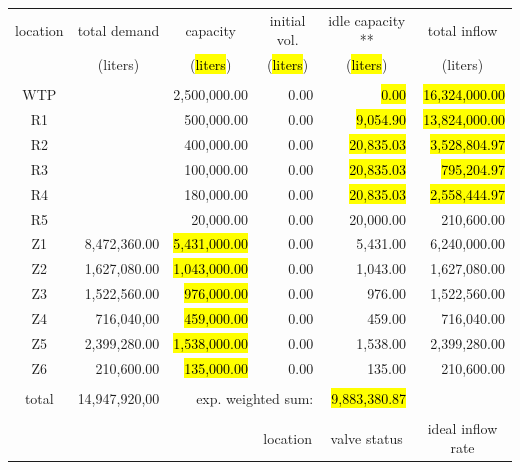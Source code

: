 \documentclass{singlecol}
\theoremstyle{TH}{
\newtheorem{lemma}{Lemma}
\newtheorem{theorem}[lemma]{Theorem}
\newtheorem{corrolary}[lemma]{Corrolary}
\newtheorem{conjecture}[lemma]{Conjecture}
\newtheorem{proposition}[lemma]{Proposition}
\newtheorem{claim}[lemma]{Claim}
\newtheorem{stheorem}[lemma]{Wrong Theorem}
\newtheorem{algorithm}{Algorithm}
}
\theoremstyle{THrm}{
\newtheorem{definition}{Definition}[section]
\newtheorem{question}{Question}[section]
\newtheorem{remark}{Remark}
\newtheorem{scheme}{Scheme}
}
\theoremstyle{THhit}{
\newtheorem{case}{Case}[section]
}
\begin{document}
\begin{table}[h!]
\begin{center}
\begin{small}
	\begin{tabular}{ c r r r r r } 
		location & \multicolumn{1}{c}{total demand}      & \multicolumn{1}{c}{capacity} & \multicolumn{1}{c}{initial vol.} & \multicolumn{1}{c}{idle capacity **} & \multicolumn{1}{c}{total inflow}  \\
		      & \multicolumn{1}{c}{(liters)} & \multicolumn{1}{c}{(\hl{liters})}   & \multicolumn{1}{c}{(\hl{liters})}     &  \multicolumn{1}{c}{(\hl{liters})}   &  \multicolumn{1}{c}{(liters)}               \\
		\\
		WTP   &               & 2,500,000.00 & 0.00 &  \hl{0.00} & \hl{16,324,000.00} \\
		R1    &               &   500,000.00 & 0.00 &    \hl{9,054.90} & \hl{13,824,000.00} \\
		R2    &               &   400,000.00 & 0.00 &    \hl{20,835.03} &  \hl{3,528,804.97} \\
		R3    &               &   100,000.00 & 0.00 &    \hl{20,835.03} &   \hl{795,204.97} \\
	    R4    &               &   180,000.00 & 0.00 &    \hl{20,835.03} &  \hl{2,558,444.97} \\
	    R5    &               &    20,000.00 & 0.00 &     20,000.00 &    210,600.00 \\
	    Z1    &  8,472,360.00 &     \hl{5,431,000.00} & 0.00 &      5,431.00 &  6,240,000.00 \\
	    Z2    &  1,627,080.00 &     \hl{1,043,000.00} & 0.00 &      1,043.00 &  1,627,080.00 \\
	    Z3    &  1,522,560.00 &       \hl{976,000.00} & 0.00 &        976.00 &  1,522,560.00 \\
	    Z4    &    716,040,00 &       \hl{459,000.00} & 0.00 &        459.00 &    716,040.00 \\
	    Z5    &  2,399,280.00 &     \hl{1,538,000.00} & 0.00 &      1,538.00 &  2,399,280.00 \\
	    Z6    &    210,600.00 &       \hl{135,000.00} & 0.00 &        135.00 &    210,600.00 \\
	    \\
	    total & 14,947,920,00 & \multicolumn{2}{r}{exp. weighted sum:} & \hl{9,883,380.87} & \\
		   \\
		&  &      &  \multicolumn{1}{c}{location}    & \multicolumn{1}{c}{valve status}         & \multicolumn{1}{c}{ideal inflow rate}   \\

\end{tabular}
\end{small}
\end{center}
\end{table}
\end{document}
